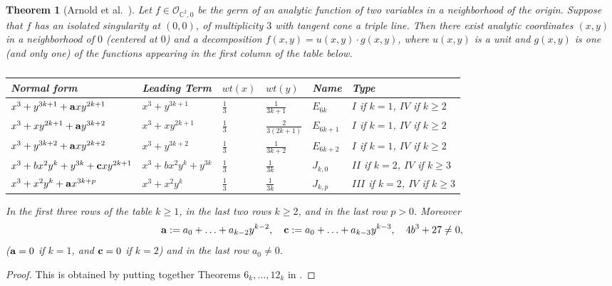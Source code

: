 \documentclass[11pt]{amsart}
\numberwithin{equation}{section}
\theoremstyle{plain}
\newtheorem{theorem}{Theorem}[section]
\theoremstyle{remark}
\theoremstyle{definition}
\newcommand{\CC}{{\mathbb C}}
\newcommand{\cO}{{\mathscr O}}
\begin{document}
\begin{theorem}[{Arnold et al.~\cite[Ch. 16]{arnold1}}]\label{thm:zoo}
%
Let $f\in\cO_{\CC^2,0}$ be the germ of an analytic function of two variables  in a neighborhood of the origin. Suppose that $f$ has  an isolated singularity at $(0,0)$, of multiplicity $3$ with tangent cone a triple line.
 Then there exist analytic coordinates $(x,y)$ in a neighborhood of $0$ (centered at $0$) and a decomposition $f(x,y)=u(x,y)\cdot g(x,y)$, where $u(x,y)$ is a unit and $g(x,y)$ is one (and only one) of the functions  appearing in the first column of the table below. 
 \begin{table}[htb!]
\renewcommand\arraystretch{1.5}
\begin{tabular}{l| l | l|l | l  | l  }
Normal form & Leading Term & $wt(x)$ &  $wt(y)$ & Name & Type \\
\hline
$x^3+y^{3k+1}+{\bf a}xy^{2k+1}$& $x^3+y^{3k+1}$ & $\frac{1}{3}$&$\frac{1}{3k+1}$   &$E_{6k}$ & $I$ if $k=1$, $IV$  if $k\ge 2$ \\
$x^3+xy^{2k+1}+{\bf a}y^{3k+2}$& $x^3+xy^{2k+1}$ & $\frac{1}{3}$ &$\frac{2}{3(2k+1)}$  &$E_{6k+1}$  &  $I$ if $k=1$, $IV$  if $k\ge 2$ \\
$x^3+y^{3k+2}+{\bf a}xy^{2k+2}$& $x^3+y^{3k+2}$ & $\frac{1}{3}$&$\frac{1}{3k+2}$   &$E_{6k+2}$ &  $I$ if $k=1$, $IV$  if $k\ge 2$ \\
$x^3+b x^2y^k+y^{3k}+{\bf c}xy^{2k+1}$ & $x^3+b x^2y^k+y^{3k}$ & $\frac{1}{3}$&$\frac{1}{3k}$   & $J_{k,0}$ & $II$ if $k=2$, $IV$  if $k\ge 3$ \\
\hdashline
$x^3+x^2y^k+{\bf a}x^{3k+p}$ & $x^3+x^2y^k$ & $\frac{1}{3}$&$\frac{1}{3k}$  & $J_{k,p}$ &  $III$  if $k=2$, $IV$  if $k\ge 3$ \\
\hline
\end{tabular}
\vspace{0.2cm}
\caption{}\label{tavola}
\end{table}
%
In the first three rows of the table $k\ge 1$, in the last two rows $k\ge 2$, and in the last row $p>0$. Moreover
%
\begin{equation*}
%
{\bf a}:=a_0+\ldots+a_{k-2}y^{k-2},\quad {\bf c}:=a_0+\ldots+a_{k-3}y^{k-3},\quad    4b^3+27\neq 0,
%
\end{equation*}
%
(${\bf a}=0$ if $k=1$, and ${\bf c}=0$ if $k=2$) and in the last row $a_0\not=0$.
%
\end{theorem}
%
\begin{proof}
%
This is obtained by putting together  Theorems $6_k,\dots, 12_k$ in \cite[\S16.2]{arnold1}.
%
\end{proof} 
\end{document}
